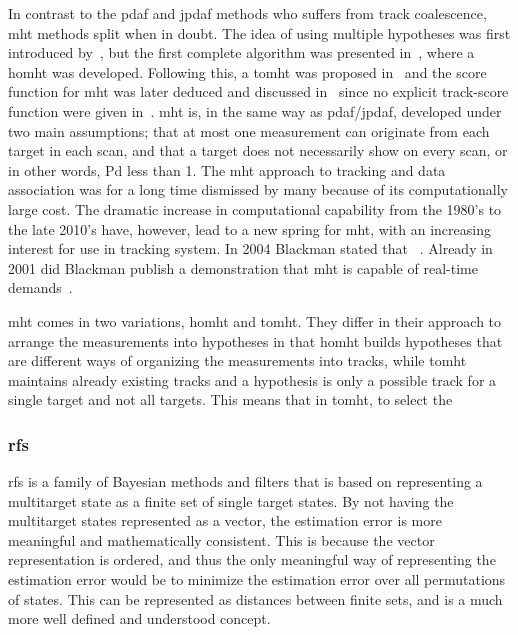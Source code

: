 In contrast to the \gls{pdaf} and \gls{jpdaf} methods who suffers from track \gls{coalescence}, \gls{mht} methods split when in doubt. The idea of using multiple hypotheses was first introduced by~\cite{Singer1974}, but the first complete algorithm was presented in~\cite{Reid1979}, where a \gls{homht} was developed. Following this, a \gls{tomht} was proposed in~\cite{Kurien1990} and the \gls{score} function for \gls{mht} was later deduced and discussed in~\cite{Bar-Shalom2007} since no explicit track-score function were given in~\cite{Kurien1990}. \gls{mht} is, in the same way as \gls{pdaf}/\gls{jpdaf}, developed under two main assumptions; that at most one \gls{measurement} can originate from each \gls{target} in each scan, and that a \gls{target} does not necessarily show on every scan, or in other words, \gls{Pd} less than 1. The \gls{mht} approach to tracking and data association was for a long time dismissed by many because of its computationally large cost. The dramatic increase in computational capability from the 1980's to the late 2010's have, however, lead to a new spring for \gls{mht}, with an increasing interest for use in tracking system. In 2004 Blackman stated that ~\cite{Blackman2004}. Already in 2001 did Blackman publish a demonstration that \gls{mht} is capable of real-time demands~\cite{Blackman2001}.

\gls{mht} comes in two variations, \gls{homht} and \gls{tomht}. They differ in their approach to arrange the measurements into hypotheses in that \gls{homht} builds hypotheses that are different ways of organizing the measurements into tracks, while \gls{tomht} maintains already existing tracks and a hypothesis is only a possible track for a single target and not all targets. This means that in \gls{tomht}, to select the 


\subsubsection{\gls{rfs}}
\Gls{rfs} is a family of Bayesian methods and filters that is based on representing a multitarget state as a finite set of single target states. By not having the multitarget states represented as a vector, the estimation error is more meaningful and mathematically consistent. This is because the vector representation is ordered, and thus the only meaningful way of representing the estimation error would be to minimize the estimation error over all permutations of states. This can be represented as distances between finite sets, and is a much more well defined and understood concept. 

